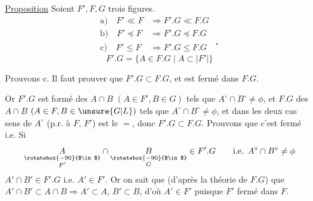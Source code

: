 \uline{Proposition} Soient $F',F,G$ trois figures.
\[
\begin{aligned}
 \text{a)}\quad F'\ll F&\Longrightarrow F'.G\ll F.G\\
 \text{b)}\quad F'\preceq F&\Longrightarrow F'.G\preceq F.G\\
 \text{c)}\quad F'\leq F&\Longrightarrow F'.G\leq F.G\quad{}^{*}
\end{aligned}
\]
\[
 F'.G=\{A\in F.G\mid A\subset |F'|\}
\]

Prouvons c. Il faut prouver que  $F'.G\subset F.G$, et est fermé dans $F.G$.

 Or $F'.G$ est formé des $A\cap B$ $(A\in F',B\in G)$ tels que $A^\circ\cap B^\circ\ne\phi$, et $F.G$ des $A\cap B$ $(A\in F,B\in \unsure{G|L})$ tels que $A^\circ\cap B^\circ\ne\phi$, et dans les deux cas  sens de $A^\circ$ (p.r. à $F$,  $F'$) est le $=$, donc $F'.G\subset F.G$. Prouvons que c'est fermé i.e.
Si 
\[
 \underset{\substack{\rotatebox{-90}{$\in$}\\ F'}}{A}\cap
 \underset{\substack{\rotatebox{-90}{$\in$}\\ G}}{B}\in F'.G\qquad
 \text{i.e. } A^\circ\cap B^\circ\ne\phi
\]
$A'\cap B'\in F'.G$ i.e. $A'\in F'$. Or on sait que (d'après la théorie de $F.G$) que $A'\cap B'\subset A\cap B\Longrightarrow A'\subset A$, $B'\subset B$, d'où $A'\in F'$ puisque $F'$ fermé dans $F$.

